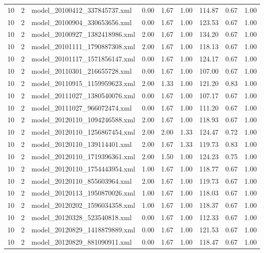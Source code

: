 \begin{table}[ht]
\begin{tabular}{rrlrrrrrr}
   10 &   2 & model\_20100412\_337845737.xml & 0.00 & 1.67 & 1.00 & 114.87 & 0.67 & 1.00 \\ 
   10 &   2 & model\_20100904\_330653656.xml & 0.00 & 1.67 & 1.00 & 123.53 & 0.67 & 1.00 \\ 
   10 &   2 & model\_20100927\_1382418986.xml & 2.00 & 1.67 & 1.00 & 134.20 & 0.67 & 1.00 \\ 
   10 &   2 & model\_20101111\_1790887308.xml & 2.00 & 1.67 & 1.00 & 118.13 & 0.67 & 1.00 \\ 
   10 &   2 & model\_20101117\_1571856147.xml & 0.00 & 1.67 & 1.00 & 124.17 & 0.67 & 1.00 \\ 
   10 &   2 & model\_20110301\_216655728.xml & 0.00 & 1.67 & 1.00 & 107.00 & 0.67 & 1.00 \\ 
   10 &   2 & model\_20110915\_1159959623.xml & 2.00 & 1.33 & 1.00 & 121.20 & 0.83 & 1.00 \\ 
   10 &   2 & model\_20111027\_1380540076.xml & 0.00 & 1.67 & 1.00 & 107.17 & 0.67 & 1.00 \\ 
   10 &   2 & model\_20111027\_966072474.xml & 0.00 & 1.67 & 1.00 & 111.20 & 0.67 & 1.00 \\ 
   10 &   2 & model\_20120110\_1094246588.xml & 2.00 & 1.67 & 1.00 & 118.93 & 0.67 & 1.00 \\ 
   10 &   2 & model\_20120110\_1256867454.xml & 2.00 & 2.00 & 1.33 & 124.47 & 0.72 & 1.00 \\ 
   10 &   2 & model\_20120110\_139114401.xml & 2.00 & 1.67 & 1.33 & 119.73 & 0.83 & 1.00 \\ 
   10 &   2 & model\_20120110\_1719396361.xml & 2.00 & 1.50 & 1.00 & 124.23 & 0.75 & 1.00 \\ 
   10 &   2 & model\_20120110\_1754443954.xml & 1.00 & 1.67 & 1.00 & 118.77 & 0.67 & 1.00 \\ 
   10 &   2 & model\_20120110\_855603964.xml & 2.00 & 1.67 & 1.00 & 119.73 & 0.67 & 1.00 \\ 
   10 &   2 & model\_20120113\_1950870026.xml & 1.00 & 1.67 & 1.00 & 118.03 & 0.67 & 1.00 \\ 
   10 &   2 & model\_20120202\_1596034358.xml & 1.00 & 1.67 & 1.00 & 118.37 & 0.67 & 1.00 \\ 
   10 &   2 & model\_20120328\_523540818.xml & 0.00 & 1.67 & 1.00 & 112.33 & 0.67 & 1.00 \\ 
   10 &   2 & model\_20120829\_1418879889.xml & 0.00 & 1.67 & 1.00 & 121.53 & 0.67 & 1.00 \\ 
   10 &   2 & model\_20120829\_881090911.xml & 0.00 & 1.67 & 1.00 & 118.47 & 0.67 & 1.00 \\ 

\end{tabular}
\end{table}
